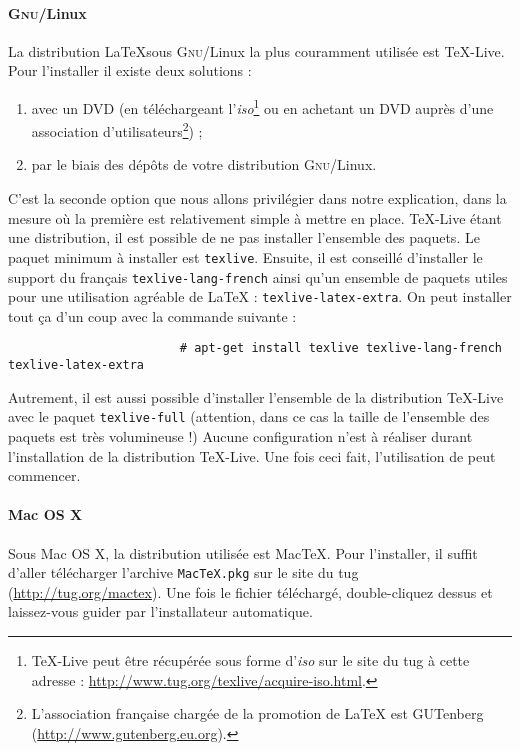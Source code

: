 \documentclass[notitlepage,onecolumn,twoside,12pt,final]{article}
\newcommand{\code}[1]{\texttt{#1}}
\begin{document}
				\paragraph{\textsc{Gnu}/Linux}
					La distribution \LaTeX sous \textsc{Gnu}/Linux la plus couramment utilisée est \TeX{}-Live. Pour l'installer il existe deux solutions :
					\begin{enumerate}
						\item avec un DVD (en téléchargeant l'\emph{iso}\footnote{\TeX{}-Live peut être récupérée sous forme d'\emph{iso} sur le site du \gls{tug} à cette adresse : \url{http://www.tug.org/texlive/acquire-iso.html}.} ou en achetant un DVD auprès d'une association d'utilisateurs\footnote{L'association française chargée de la promotion de \LaTeX{} est GUTenberg (\url{http://www.gutenberg.eu.org}).}) ;
						\item par le biais des dépôts de votre distribution \textsc{Gnu}/Linux.
					\end{enumerate}
					
					C'est la seconde option que nous allons privilégier dans notre explication, dans la mesure où la première est relativement simple à mettre en place. \TeX{}-Live étant une distribution, il est possible de ne pas installer l'ensemble des paquets. Le paquet minimum à installer est \code{texlive}. Ensuite, il est conseillé d'installer le support du français \code{texlive-lang-french} ainsi qu'un ensemble de paquets utiles pour une utilisation agréable de \LaTeX{} : \code{texlive-latex-extra}. On peut installer tout ça d'un coup avec la commande suivante :
					\lstset{language=bash}
					\begin{verbatim}
						# apt-get install texlive texlive-lang-french texlive-latex-extra
					\end{verbatim}
					
					Autrement, il est aussi possible d'installer l'ensemble de la distribution \TeX{}-Live avec le paquet \code{texlive-full} (attention, dans ce cas la taille de l'ensemble des paquets est très volumineuse !) Aucune configuration n'est à réaliser durant l'installation de la distribution \TeX{}-Live. Une fois ceci fait, l'utilisation de \XeLaTeX{} peut commencer.
					
				\paragraph{Mac OS X}
					Sous Mac OS X, la distribution utilisée est Mac\TeX{}. Pour l'installer, il suffit d'aller télécharger l'archive \texttt{Mac\TeX{}.pkg} sur le site du \gls{tug} (\url{http://tug.org/mactex}). Une fois le fichier téléchargé, double-cliquez dessus et laissez-vous guider par l'installateur automatique.
					
\end{document}
